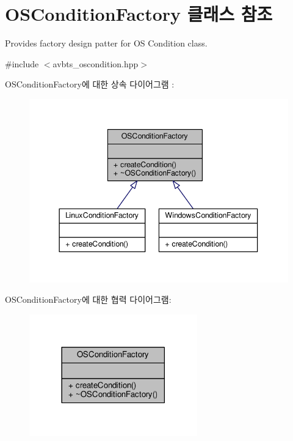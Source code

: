\hypertarget{class_o_s_condition_factory}{}\section{O\+S\+Condition\+Factory 클래스 참조}
\label{class_o_s_condition_factory}


Provides factory design patter for OS Condition class.  




{\ttfamily \#include $<$avbts\+\_\+oscondition.\+hpp$>$}



O\+S\+Condition\+Factory에 대한 상속 다이어그램 \+: 
\nopagebreak
\begin{figure}[H]
\begin{center}
\leavevmode
\includegraphics[width=344pt]{class_o_s_condition_factory__inherit__graph}
\end{center}
\end{figure}


O\+S\+Condition\+Factory에 대한 협력 다이어그램\+:
\nopagebreak
\begin{figure}[H]
\begin{center}
\leavevmode
\includegraphics[width=206pt]{class_o_s_condition_factory__coll__graph}
\end{center}
\end{figure}
